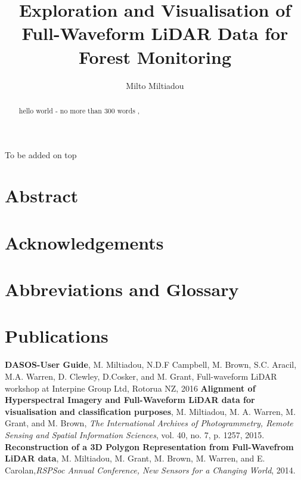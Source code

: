 \documentclass[11pt,nofootinbib]{report}
\title{Exploration and Visualisation of Full-Waveform LiDAR Data for Forest Monitoring}
\author{Milto Miltiadou}
\begin{document}
	\maketitle
 		
\begin{abstract}	
     hello world - no more than 300 words
     {\color{blue}{We can change colors for emphasis}},
     {\color{green}{but}} {\color{cyan}{who is going pay for the ink?}}
     \thispagestyle{empty}
\end{abstract}

\newpage
\thispagestyle{empty}
	\setcounter{secnumdepth}{0}
	To be added on top
	\section{Abstract}\label{Abstract}
		
		\thispagestyle{empty}
		\newpage
	\section{Acknowledgements}\label{Acknowledgments}
		
		\thispagestyle{empty}
		\newpage
	

	\section {Abbreviations and Glossary}\label{Abbreviations}
	
	\newpage
	\section{Publications}
		\textbf{DASOS-User Guide}, M. Miltiadou, N.D.F Campbell, M. Brown, S.C. Aracil, M.A. Warren, D. Clewley, D.Cosker, and M. Grant, Full-waveform LiDAR workshop at Interpine Group Ltd, Rotorua NZ, 2016\newline
		\textbf{Alignment of Hyperspectral Imagery and Full-Waveform LiDAR data for visualisation and classification purposes}, M. Miltiadou, M. A. Warren, M. Grant, and M. Brown, \textit{The International Archives of Photogrammetry, Remote Sensing and Spatial Information Sciences}, vol. 40, no. 7, p. 1257, 2015.\newline
		\textbf{Reconstruction of a 3D Polygon Representation from Full-Wavefrom LiDAR data}, M. Miltiadou, M. Grant, M. Brown, M. Warren, and E. Carolan,\textit{RSPSoc Annual Conference, New Sensors for a Changing World}, 2014.\newline
	 
\end{document}
